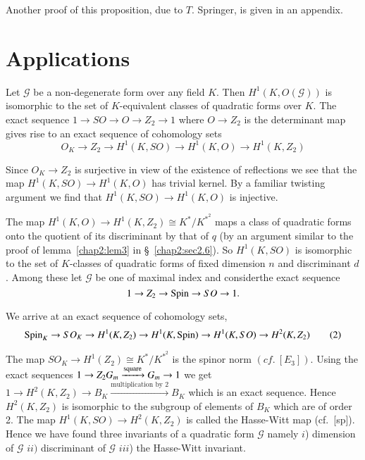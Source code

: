  Another proof of this proposition, due to $T$. Springer, is given in
 an appendix.  

\section{Applications}\label{chap5:sec5.11}



Let $\mathscr{G}$ be a non-degenerate form over any field $K$. Then
$H^1(K, O (\mathscr{G}))$ is isomorphic to the set of $K$-equivalent
classes of quadratic forms over $K$. The exact sequence $1 \to SO \to O \to
Z_2 \to 1$ where $O \to Z_2$ is the determinant map gives rise to an
exact sequence of cohomology sets 
$$
O_K \to Z_2 \to H^1(K,SO) \to H^1(K,O) \to  H^1 (K,Z_2)  
$$

Since $O_K \to Z_2$ is surjective in view of the existence of
reflections we see that the map $H^1(K,SO) \to H^1(K,O)$ has trivial
kernel. By a familiar twisting argument we find that $H^1(K,SO) \to
H^1(K,O)$ is injective. 

The map $H^1(K,O) \to H^1(K,Z_2) \cong K^*/K^{*^2}$ maps a class of
quadratic forms onto the quotient of its discriminant by that of $q$
(by an argument similar to the proof of lemma~\ref{chap2:lem3} in 
\S~\ref{chap2:sec2.6}). So 
$H^1(K,SO)$ is isomorphic to the set of $K$-classes of quadratic forms
of fixed dimension $n$ and discriminant $d$. Among these let
$\mathscr{G}$ be one of maximal index and consider\pageoriginale the
exact sequence  
$$
1 \to Z_2 \to \operatorname{Spin} \to SO \to 1. 
$$ 

We arrive at an exact sequence of cohomology sets,
{\fontsize{10}{12}\selectfont
\begin{equation*}
\operatorname{Spin}_K \to SO_K \to H^1(K,Z_2) \to H^1(K,\operatorname{Spin}) \to H^1(K,SO) \to
H^2(K,Z_2)  \tag{2}
\end{equation*}}

The map $SO_K \to H^1(Z_2) \cong K^*/K^{*^2}$ is the spinor norm
$(cf.~[E_3])$. Using the exact sequences $1 \to Z_2 G_m
\xrightarrow{\rm square}  G_m \to 1$ we get $1 \to H^2(K,Z_2)\to B_K
\xrightarrow{\text{multiplication by 2}}  B_K$ which is an exact
sequence. Hence $H^2(K,Z_2)$ is isomorphic to the subgroup of elements
of $B_K$ which are of order 2. The map $H^1(K,SO)\to H^2 (K,Z_2)$ is
called the Hasse-Witt map (cf.\ [sp]). Hence we have found three
invariants of a quadratic form $\mathscr{G}$ namely $i$) dimension of
$\mathscr{G}$ $ii)$ discriminant of $\mathscr{G}$ $iii$) the
Hasse-Witt invariant. 

